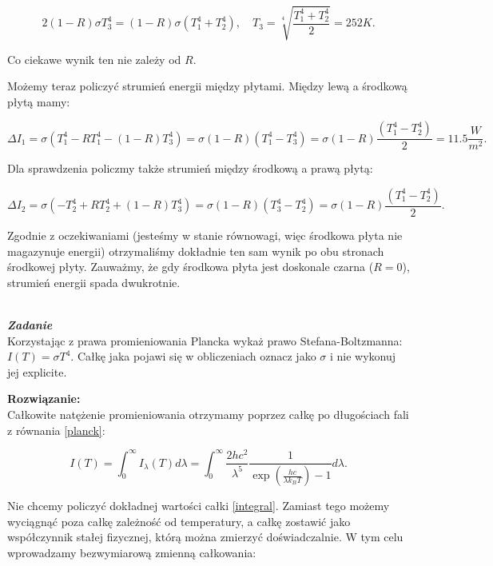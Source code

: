 \documentclass[11pt,a4paper]{article}
\newcounter{zadanie}\newcommand{\zadanie}[1][]{\addtocounter{zadanie}{1} ~\\  {\bf \emph{Zadanie \arabic{zadanie} #1 }} \\}
\begin{document}
\begin{equation}
2(1-R) \sigma T_3^4 = (1-R) \sigma (T_1^4+T_2^4), \quad T_3 = \sqrt[4]{\frac{T_1^4+T_2^4}{2}}= 252 K.
\end{equation}

Co ciekawe wynik ten nie zależy od $R$.

Możemy teraz policzyć strumień energii między płytami. Między lewą a środkową płytą mamy:

\begin{equation}
  \Delta I_1 = \sigma (  T_1^4- R T_1^4 - (1-R)T_3^4) = \sigma (1-R) (T_1^4-T_3^4) =
  \sigma(1-R) \frac{(T_1^4-T_2^4)}{2} = 11.5 \frac{W}{m^2}.
\end{equation}

Dla sprawdzenia policzmy także strumień między środkową a prawą płytą:

\begin{equation}
  \Delta I_2 = \sigma (  -T_2^4 + R T_2^4 + (1-R)T_3^4) =
  \sigma (1-R) (T_3^4-T_2^4) = \sigma(1-R) \frac{(T_1^4-T_2^4)}{2}.
\end{equation}

Zgodnie z oczekiwaniami (jesteśmy w stanie równowagi, więc środkowa płyta nie magazynuje energii)
otrzymaliśmy dokładnie ten sam wynik po obu stronach środkowej płyty. Zauważmy, że gdy środkowa płyta
jest doskonale czarna ($R=0$), strumień energii spada dwukrotnie.

\newpage

\zadanie
Korzystając z prawa promieniowania Plancka wykaż prawo Stefana-Boltzmanna:  $I(T) = \sigma T^4$.
Całkę jaka pojawi się w obliczeniach oznacz jako $\sigma$ i nie wykonuj jej explicite.


\vskip 10pt
\textbf{Rozwiązanie:}\\
Całkowite natężenie promieniowania otrzymamy poprzez całkę po długościach fali z równania \eqref{planck}:

\begin{equation}
  I(T) = \int_0^\infty I_\lambda(T) d\lambda =
  \int_0^\infty \frac{2 h c^2}{\lambda^5} \frac{1}{\exp\left(\frac{h c}{\lambda k_B T}\right)-1} d\lambda. \label{integral}
\end{equation}

Nie chcemy policzyć dokładnej wartości całki \eqref{integral}. Zamiast tego możemy wyciągnąć poza
całkę zależność od temperatury, a całkę zostawić jako współczynnik stałej fizycznej, którą można
zmierzyć doświadczalnie. W tym celu wprowadzamy bezwymiarową zmienną całkowania:
\end{document}
